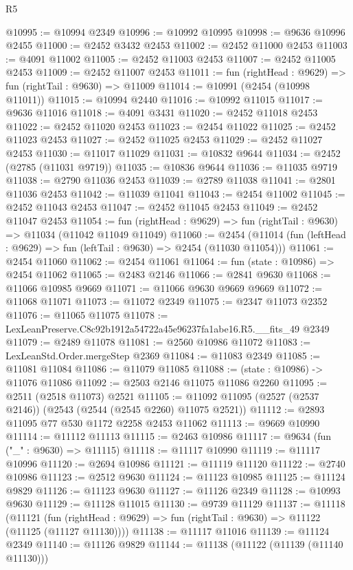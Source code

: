 \begin{lexlean}{R5}
\begin{coremodule}
@10995 := @10994 @2349
@10996 := @10992 @10995
@10998 := @9636 @10996 @2455
@11000 := @2452 @3432 @2453
@11002 := @2452 @11000 @2453
@11003 := @4091 @11002
@11005 := @2452 @11003 @2453
@11007 := @2452 @11005 @2453
@11009 := @2452 @11007 @2453
@11011 := fun (rightHead : @9629) => fun (rightTail : @9630) => @11009
@11014 := @10991 (@2454 (@10998 @11011))
@11015 := @10994 @2440
@11016 := @10992 @11015
@11017 := @9636 @11016
@11018 := @4091 @3431
@11020 := @2452 @11018 @2453
@11022 := @2452 @11020 @2453
@11023 := @2454 @11022
@11025 := @2452 @11023 @2453
@11027 := @2452 @11025 @2453
@11029 := @2452 @11027 @2453
@11030 := @11017 @11029
@11031 := @10832 @9644
@11034 := @2452 (@2785 (@11031 @9719))
@11035 := @10836 @9644
@11036 := @11035 @9719
@11038 := @2790 @11036 @2453
@11039 := @2789 @11038
@11041 := @2801 @11036 @2453
@11042 := @11039 @11041
@11043 := @2454 @11002
@11045 := @2452 @11043 @2453
@11047 := @2452 @11045 @2453
@11049 := @2452 @11047 @2453
@11054 := fun (rightHead : @9629) => fun (rightTail : @9630) => @11034 (@11042 @11049 @11049)
@11060 := @2454 (@11014 (fun (leftHead : @9629) => fun (leftTail : @9630) => @2454 (@11030 @11054)))
@11061 := @2454 @11060
@11062 := @2454 @11061
@11064 := fun (state : @10986) => @2454 @11062
@11065 := @2483 @2146
@11066 := @2841 @9630
@11068 := @11066 @10985 @9669
@11071 := @11066 @9630 @9669 @9669
@11072 := @11068 @11071
@11073 := @11072 @2349
@11075 := @2347 @11073 @2352
@11076 := @11065 @11075
@11078 := LexLeanPreserve.C8c92b1912a54722a45e96237fa1abe16.R5.__fits_49 @2349
@11079 := @2489 @11078
@11081 := @2560 @10986 @11072
@11083 := LexLeanStd.Order.mergeStep @2369
@11084 := @11083 @2349
@11085 := @11081 @11084
@11086 := @11079 @11085
@11088 := (state : @10986) -> @11076 @11086
@11092 := @2503 @2146 @11075 @11086 @2260
@11095 := @2511 (@2518 @11073) @2521
@11105 := @11092 @11095 (@2527 (@2537 @2146)) (@2543 (@2544 (@2545 @2260) @11075 @2521))
@11112 := @2893 @11095 @77 @530 @1172 @2258 @2453 @11062
@11113 := @9669 @10990
@11114 := @11112 @11113
@11115 := @2463 @10986
@11117 := @9634 (fun ("_" : @9630) => @11115)
@11118 := @11117 @10990
@11119 := @11117 @10996
@11120 := @2694 @10986
@11121 := @11119 @11120
@11122 := @2740 @10986
@11123 := @2512 @9630
@11124 := @11123 @10985
@11125 := @11124 @9829
@11126 := @11123 @9630
@11127 := @11126 @2349
@11128 := @10993 @9630
@11129 := @11128 @11015
@11130 := @9739 @11129
@11137 := @11118
    (@11121 (fun (rightHead : @9629) => fun (rightTail : @9630) => @11122 (@11125 (@11127 @11130))))
@11138 := @11117 @11016
@11139 := @11124 @2349
@11140 := @11126 @9829
@11144 := @11138 (@11122 (@11139 (@11140 @11130)))

\end{coremodule}
\end{lexlean}

